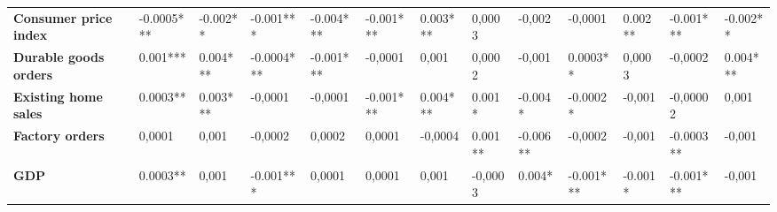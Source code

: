\begin{landscape}
\begin{table}[]
{\begin{tabular}{@{}lllllllllllll@{}}
\textbf{Consumer price index}     & -0.0005***                              & -0.002**                                & -0.001***                               & -0.004***                               & -0.001***                               & 0.003***                                & 0,0003                                  & -0,002                                  & -0,0001                                 & 0.002**                                 & -0.001***                               & -0.002**                                \\
\textbf{Durable goods orders}     & 0.001***                                & 0.004***                                & -0.0004***                              & -0.001***                               & -0,0001                                 & 0,001                                   & 0,0002                                  & -0,001                                  & 0.0003**                                & 0,0003                                  & -0,0002                                 & 0.004***                                \\
\textbf{Existing home sales}      & 0.0003**                                & 0.003***                                & -0,0001                                 & -0,0001                                 & -0.001***                               & 0.004***                                & 0.001*                                  & -0.004*                                 & -0.0002*                                & -0,001                                  & -0,00002                                & 0,001                                   \\
\textbf{Factory orders}           & 0,0001                                  & 0,001                                   & -0,0002                                 & 0,0002                                  & 0,0001                                  & -0,0004                                 & 0.001**                                 & -0.006**                                & -0,0002                                 & -0,001                                  & -0.0003**                               & -0,001                                  \\
\textbf{GDP}                      & 0.0003**                                & 0,001                                   & -0.001***                               & 0,0001                                  & 0,0001                                  & 0,001                                   & -0,0003                                 & 0.004*                                  & -0.001***                               & -0.001*                                 & -0.001***                               & -0,001                                  \\

\end{tabular}}
\end{table}
\end{landscape}
